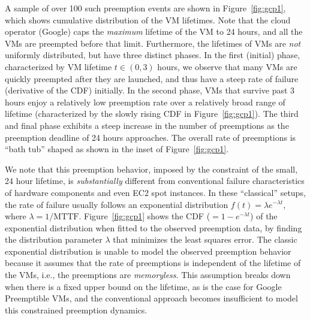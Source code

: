 A sample of over 100 such preemption events are shown in Figure~\ref{fig:gcp1}, which shows cumulative distribution of the VM lifetimes. 
Note that the cloud operator (Google) caps the \emph{maximum} lifetime of the VM to 24 hours, and all the VMs are preempted before that limit. 
Furthermore, the lifetimes of VMs are \emph{not} uniformly distributed, but have three distinct phases. 
In the first (initial) phase, characterized by VM lifetime $t\in (0,3)$ hours, we observe that many VMs are quickly preempted after they are launched, and thus have a steep rate of failure (derivative of the CDF) initially.
In the second phase, VMs that survive past 3 hours enjoy a relatively low preemption rate over a relatively broad range of lifetime (characterized by the slowly rising CDF in Figure~\ref{fig:gcp1}). The third and final phase exhibits a steep increase in the number of preemptions as the preemption deadline of 24 hours approaches. The overall rate of preemptions is ``bath tub'' shaped as shown in the inset of Figure~\ref{fig:gcp1}.


We note that this preemption behavior, imposed by the constraint of the small, 24 hour  lifetime, is \emph{substantially} different from conventional failure characteristics of hardware components and even EC2 spot instances.
In these ``classical'' setups, the rate of failure  usually follows an exponential distribution $f(t) = \lambda e^{-\lambda t}$, where $\lambda=1/\text{MTTF}$.
Figure~\ref{fig:gcp1} shows the CDF ($=1-e^{-\lambda t}$) of the exponential distribution when fitted to the observed preemption data, by finding the distribution parameter $\lambda$ that minimizes the least squares error.
The classic exponential distribution is unable to model the observed preemption behavior because it assumes that the rate of preemptions is independent of the lifetime of the VMs, i.e., the preemptions are \emph{memoryless}.
This assumption breaks down when there is a fixed upper bound on the lifetime, as is the case for Google Preemptible VMs, and the conventional approach becomes insufficient to model this constrained preemption dynamics. 

